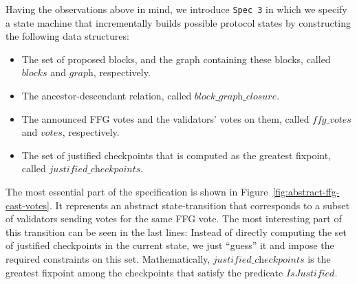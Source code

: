 Having the observations above in mind, we introduce \texttt{Spec 3} in which we
specify a state machine that incrementally builds possible protocol states by
constructing the following data structures:

\begin{itemize}

    \item The set of proposed blocks, and the graph containing these blocks,
        called $\textit{blocks}$ and $\textit{graph}$, respectively.

    \item The ancestor-descendant relation, called
        $\textit{block\_graph\_closure}$.

    \item The announced FFG votes and the validators' votes on them, called
        $\textit{ffg\_votes}$ and $\textit{votes}$, respectively.

    \item The set of justified checkpoints that is computed as the greatest
        fixpoint, called $\textit{justified\_checkpoints}$.

\end{itemize}

The most essential part of the specification is shown in
Figure~\ref{fig:abstract-ffg-cast-votes}. It represents an abstract
state-transition that corresponds to a subset of validators sending votes for
the same FFG vote. The most interesting part of this transition can be seen in
the last lines: Instead of directly computing the set of justified checkpoints
in the current state, we just ``guess'' it and impose the required constraints
on this set. Mathematically, $\textit{justified\_checkpoints}$ is the greatest
fixpoint among the checkpoints that satisfy the predicate
$\textit{IsJustified}$.


